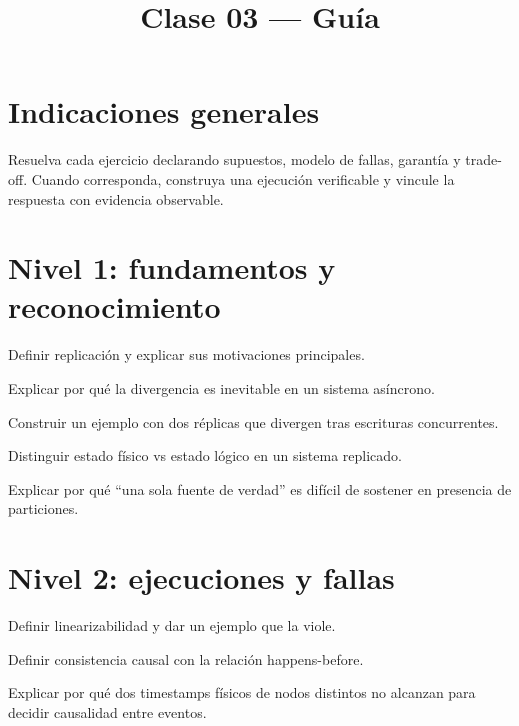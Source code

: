 \documentclass[variant=guia,cover=institutional,mode=screen]{ua-engineering-v6-article}
\title{Clase 03 --- Guía}
\author{\UAProfessor}
\date{\UADate}
\begin{document}
\section{Indicaciones generales}
Resuelva cada ejercicio declarando supuestos, modelo de fallas, garantía y trade-off. Cuando corresponda, construya una ejecución verificable y vincule la respuesta con evidencia observable.

\section{Nivel 1: fundamentos y reconocimiento}
\begin{uaexercise}
Definir replicación y explicar sus motivaciones principales.
\end{uaexercise}

\begin{uaexercise}
Explicar por qué la divergencia es inevitable en un sistema asíncrono.
\end{uaexercise}

\begin{uaexercise}
Construir un ejemplo con dos réplicas que divergen tras escrituras concurrentes.
\end{uaexercise}

\begin{uaexercise}
Distinguir estado físico vs estado lógico en un sistema replicado.
\end{uaexercise}

\begin{uaexercise}
Explicar por qué “una sola fuente de verdad” es difícil de sostener en presencia de particiones.
\end{uaexercise}


\section{Nivel 2: ejecuciones y fallas}
\begin{uaexercise}
Definir linearizabilidad y dar un ejemplo que la viole.
\end{uaexercise}

\begin{uaexercise}
Definir consistencia causal con la relación happens-before.
\end{uaexercise}

\begin{uaexercise}
Explicar por qué dos timestamps físicos de nodos distintos no alcanzan para decidir causalidad entre eventos.
\end{uaexercise}
\end{document}
